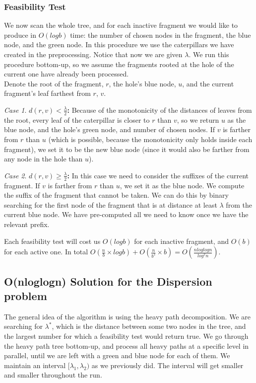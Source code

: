 \documentclass[11pt,a4paper]{article}
\theoremstyle{definition}
\theoremstyle{remark}
\newtheorem{case}{Case}
\begin{document}
\subsubsection{Feasibility Test}
We now scan the whole tree, and for each inactive fragment we would like to produce in $O(logb)$ time: the number of chosen nodes in the fragment, the blue node, and the green node. In this procedure we use the caterpillars we have created in the preprocessing. Notice that now we are given $\lambda$.
We run this procedure bottom-up, so we assume the fragments rooted at the hole of the current one have already been processed.\\
Denote the root of the fragment, $r$, the hole's blue node, $u$, and the current fragment's leaf farthest from $r$, $v$.\\
\begin{case}
\textbf{$d(r,v) < \frac{\lambda}{2}$:} Because of the monotonicity of the distances of leaves from the root, every leaf of the caterpillar is closer to $r$ than $v$, so we return $u$ as the blue node, and the hole's green node, and number of chosen nodes. If $v$ is farther from $r$ than $u$ (which is possible, because the monotonicity only holds inside each fragment), we set it to be the new blue node (since it would also be farther from any node in the hole than $u$).
\end{case}
\begin{case}
\textbf{$d(r,v) \geq \frac{\lambda}{2}$:}
In this case we need to consider the suffixes of the current fragment. If $v$ is farther from $r$ than $u$, we set it as the blue node. We compute the suffix of the fragment that cannot be taken. We can do this by binary searching for the first node of the fragment that is at distance at least $\lambda$ from the current blue node. We have pre-computed all we need to know once we have the relevant prefix.
\end{case}
Each feasibility test will cost us $O(logb)$ for each inactive fragment, and $O(b)$ for each active one. In total $O(\frac{n}{b} \times logb) + O(\frac{n}{b^2} \times b) = O(\frac{nloglogn}{log^2n})$.


\subsection{O(nloglogn) Solution for the Dispersion problem} \label{nloglogn solution}
The general idea of the algorithm is using the heavy path decomposition. We are searching for $\lambda^*$, which is the distance between some two nodes in the tree, and the largest number for which a feasibility test would return true.
We go through the heavy path tree bottom-up, and process all heavy paths at a specific level in parallel, until we are left with a green and blue node for each of them. We maintain an interval $[\lambda_1,\lambda_2)$ as we previously did. The interval will get smaller and smaller throughout the run.
\end{document}
